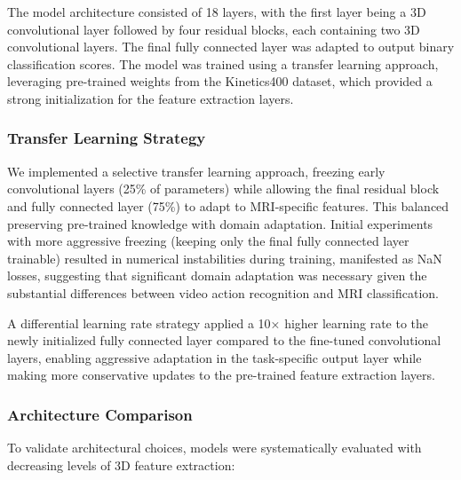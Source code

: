 \documentclass[12pt, a4paper]{article}
\begin{document}
The model architecture consisted of 18 layers, with the first layer being a 3D convolutional layer followed by four residual blocks, each containing two 3D convolutional layers. The final fully connected layer was adapted to output binary classification scores. The model was trained using a transfer learning approach, leveraging pre-trained weights from the Kinetics400 dataset, which provided a strong initialization for the feature extraction layers.

\subsubsection{Transfer Learning Strategy}

We implemented a selective transfer learning approach, freezing early convolutional layers (25\% of parameters) while allowing the final residual block and fully connected layer (75\%) to adapt to MRI-specific features. This balanced preserving pre-trained knowledge with domain adaptation. Initial experiments with more aggressive freezing (keeping only the final fully connected layer trainable) resulted in numerical instabilities during training, manifested as NaN losses, suggesting that significant domain adaptation was necessary given the substantial differences between video action recognition and MRI classification.

A differential learning rate strategy applied a 10× higher learning rate to the newly initialized fully connected layer compared to the fine-tuned convolutional layers, enabling aggressive adaptation in the task-specific output layer while making more conservative updates to the pre-trained feature extraction layers.

\subsubsection{Architecture Comparison}

To validate architectural choices, models were systematically evaluated with decreasing levels of 3D feature extraction:
\end{document}
